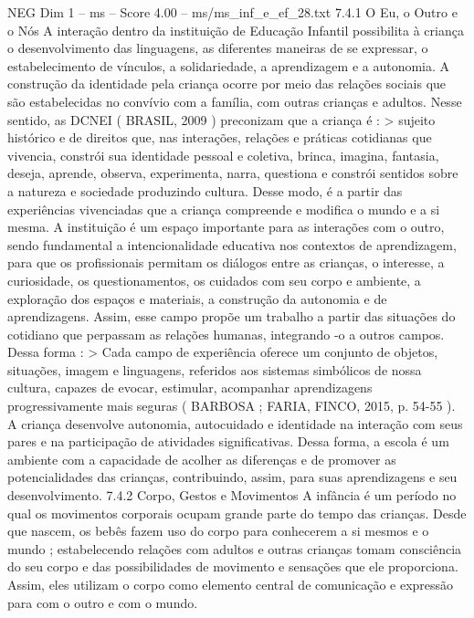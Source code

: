 \begin{textsample}{NEG Dim 1 – ms – Score 4.00 – ms/ms\_inf\_e\_ef\_28.txt}  \label{ex:f1_neg_105}
7.4.1 O Eu, o Outro e o Nós A interação dentro da instituição de Educação Infantil possibilita à criança o desenvolvimento das linguagens, as diferentes maneiras de se expressar, o estabelecimento de vínculos, a solidariedade, a aprendizagem e a autonomia.
A construção da identidade pela criança ocorre por meio das relações sociais que são estabelecidas no convívio com a família, com outras crianças e adultos.
Nesse sentido, as DCNEI ( BRASIL, 2009 ) preconizam que a criança é : > sujeito histórico e de direitos que, nas interações, relações e práticas cotidianas que vivencia, constrói sua identidade pessoal e coletiva, brinca, imagina, fantasia, deseja, aprende, observa, experimenta, narra, questiona e constrói sentidos sobre a natureza e sociedade produzindo cultura.
Desse modo, é a partir das experiências vivenciadas que a criança compreende e modifica o mundo e a si mesma.
A instituição é um espaço importante para as interações com o outro, sendo fundamental a intencionalidade educativa nos contextos de aprendizagem, para que os profissionais permitam os diálogos entre as crianças, o interesse, a curiosidade, os questionamentos, os cuidados com seu corpo e ambiente, a exploração dos espaços e materiais, a construção da autonomia e de aprendizagens.
Assim, esse campo propõe um trabalho a partir das situações do cotidiano que perpassam as relações humanas, integrando -o a outros campos.
Dessa forma : > Cada campo de experiência oferece um conjunto de objetos, situações, imagem e linguagens, referidos aos sistemas simbólicos de nossa cultura, capazes de evocar, estimular, acompanhar aprendizagens progressivamente mais seguras ( BARBOSA ; FARIA, FINCO, 2015, p. 54-55 ).
A criança desenvolve autonomia, autocuidado e identidade na interação com seus pares e na participação de atividades significativas.
Dessa forma, a escola é um ambiente com a capacidade de acolher as diferenças e de promover as potencialidades das crianças, contribuindo, assim, para suas aprendizagens e seu desenvolvimento. 7.4.2 Corpo, Gestos e Movimentos A infância é um período no qual os movimentos corporais ocupam grande parte do tempo das crianças.
Desde que nascem, os bebês fazem uso do corpo para conhecerem a si mesmos e o mundo ; estabelecendo relações com adultos e outras crianças tomam consciência do seu corpo e das possibilidades de movimento e sensações que ele proporciona.
Assim, eles utilizam o corpo como elemento central de comunicação e expressão para com o outro e com o mundo.

\end{textsample}
